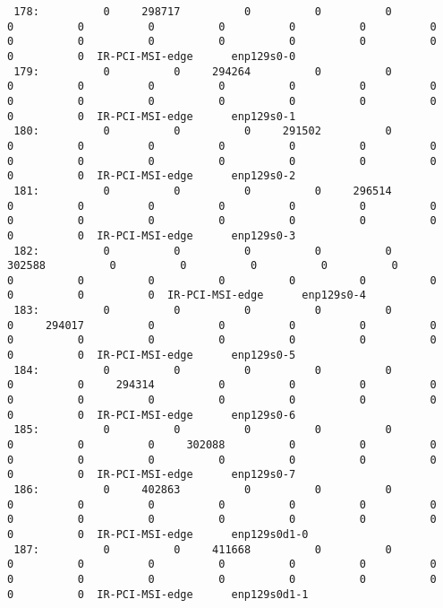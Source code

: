 \begin{lstlisting}
 178:          0     298717          0          0          0          0          0          0          0          0          0          0          0          0          0          0          0          0          0          0          0  IR-PCI-MSI-edge      enp129s0-0
 179:          0          0     294264          0          0          0          0          0          0          0          0          0          0          0          0          0          0          0          0          0          0  IR-PCI-MSI-edge      enp129s0-1
 180:          0          0          0     291502          0          0          0          0          0          0          0          0          0          0          0          0          0          0          0          0          0  IR-PCI-MSI-edge      enp129s0-2
 181:          0          0          0          0     296514          0          0          0          0          0          0          0          0          0          0          0          0          0          0          0          0  IR-PCI-MSI-edge      enp129s0-3
 182:          0          0          0          0          0     302588          0          0          0          0          0          0          0          0          0          0          0          0          0          0          0  IR-PCI-MSI-edge      enp129s0-4
 183:          0          0          0          0          0          0     294017          0          0          0          0          0          0          0          0          0          0          0          0          0          0  IR-PCI-MSI-edge      enp129s0-5
 184:          0          0          0          0          0          0          0     294314          0          0          0          0          0          0          0          0          0          0          0          0          0  IR-PCI-MSI-edge      enp129s0-6
 185:          0          0          0          0          0          0          0          0     302088          0          0          0          0          0          0          0          0          0          0          0          0  IR-PCI-MSI-edge      enp129s0-7
 186:          0     402863          0          0          0          0          0          0          0          0          0          0          0          0          0          0          0          0          0          0          0  IR-PCI-MSI-edge      enp129s0d1-0
 187:          0          0     411668          0          0          0          0          0          0          0          0          0          0          0          0          0          0          0          0          0          0  IR-PCI-MSI-edge      enp129s0d1-1

\end{lstlisting}
